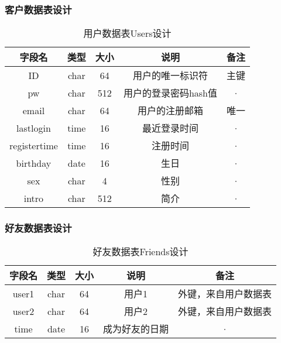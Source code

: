 \subsubsection{客户数据表设计}
\begin{table}[htbp]
\centering
\caption{用户数据表Users设计} \label{tab:client-database}
\begin{tabular}{|c|c|c|c|c|}
    \hline
    字段名 & 类型 & 大小 & 说明 & 备注 \\
    \hline
    ID & char & 64 & 用户的唯一标识符 & 主键 \\
    \hline
    pw & char & 512 & 用户的登录密码hash值 & · \\
    \hline
    email & char & 64 & 用户的注册邮箱 & 唯一 \\
    \hline
    lastlogin & time & 16 & 最近登录时间 & · \\
    \hline
    registertime & time & 16 & 注册时间 & · \\
    \hline
    birthday & date & 16 & 生日 & · \\
    \hline
    sex & char & 4 & 性别 & · \\
    \hline
    intro      & char & 512  & 简介 & · \\
	\hline
\end{tabular}
\end{table}


\subsubsection{好友数据表设计}
\begin{table}[htbp]
\centering
\caption{好友数据表Friends设计} \label{tab:friend-database}
\begin{tabular}{|c|c|c|c|c|}
    \hline
    字段名 & 类型 & 大小 & 说明 & 备注 \\
    \hline
    user1 & char & 64 & 用户1 & 外键，来自用户数据表 \\
    \hline
    user2 & char & 64 & 用户2 & 外键，来自用户数据表 \\
    \hline
       time & date & 16 & 成为好友的日期 & · \\
    \hline
\end{tabular}
\end{table}


